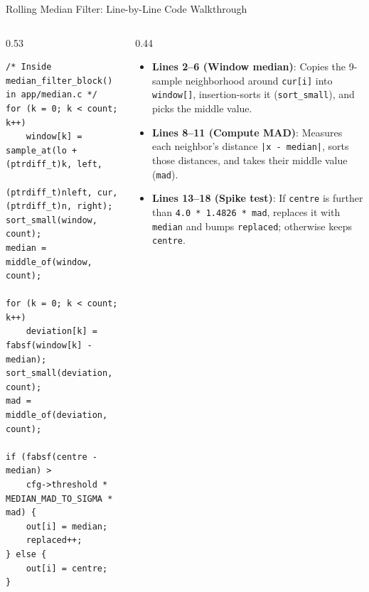 \begin{frame}[fragile]{Rolling Median Filter: Line-by-Line Code Walkthrough}
  \begin{columns}[t, onlytextwidth]
    \begin{column}{0.53\textwidth}
\begin{lstlisting}
/* Inside median_filter_block() in app/median.c */
for (k = 0; k < count; k++)
    window[k] = sample_at(lo + (ptrdiff_t)k, left,
                          (ptrdiff_t)nleft, cur, (ptrdiff_t)n, right);
sort_small(window, count);
median = middle_of(window, count);

for (k = 0; k < count; k++)
    deviation[k] = fabsf(window[k] - median);
sort_small(deviation, count);
mad = middle_of(deviation, count);

if (fabsf(centre - median) >
    cfg->threshold * MEDIAN_MAD_TO_SIGMA * mad) {
    out[i] = median;
    replaced++;
} else {
    out[i] = centre;
}
\end{lstlisting}
    \end{column}
    \begin{column}{0.44\textwidth}
      \smalltext\compactitem
      \begin{itemize}
        \item \textbf{Lines 2--6 (Window median)}: Copies the 9-sample neighborhood around \texttt{cur[i]} into \texttt{window[]}, insertion-sorts it (\texttt{sort\_small}), and picks the middle value.
        \item \textbf{Lines 8--11 (Compute MAD)}: Measures each neighbor's distance \texttt{|x - median|}, sorts those distances, and takes their middle value (\texttt{mad}).
        \item \textbf{Lines 13--18 (Spike test)}: If \texttt{centre} is further than \texttt{4.0 * 1.4826 * mad}, replaces it with \texttt{median} and bumps \texttt{replaced}; otherwise keeps \texttt{centre}.
      \end{itemize}
    \end{column}
  \end{columns}
\end{frame}

